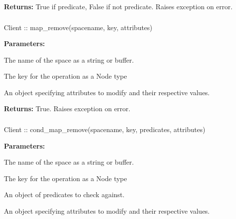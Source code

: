 \noindent\textbf{Returns:}
True if predicate, False if not predicate.  Raises exception on error.

\subsubsection{}
\label{api:nodejs:map_remove}
\begin{javascriptcode}
Client :: map_remove(spacename, key, attributes)
\end{javascriptcode}
\funcdesc 

\noindent\textbf{Parameters:}
\begin{description}[labelindent=\widthof{{\code{attributes}}},leftmargin=*,noitemsep,nolistsep,align=right]
\item[\code{spacename}] The name of the space as a string or buffer.
\item[\code{key}] The key for the operation as a Node type
\item[\code{attributes}] An object specifying attributes to modify and their respective values.
\end{description}

\noindent\textbf{Returns:}
True.  Raises exception on error.

\subsubsection{}
\label{api:nodejs:cond_map_remove}
\begin{javascriptcode}
Client :: cond_map_remove(spacename, key, predicates, attributes)
\end{javascriptcode}
\funcdesc 

\noindent\textbf{Parameters:}
\begin{description}[labelindent=\widthof{{\code{predicates}}},leftmargin=*,noitemsep,nolistsep,align=right]
\item[\code{spacename}] The name of the space as a string or buffer.
\item[\code{key}] The key for the operation as a Node type
\item[\code{predicates}] An object of predicates to check against.
\item[\code{attributes}] An object specifying attributes to modify and their respective values.
\end{description}

